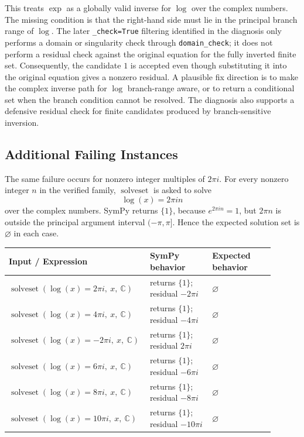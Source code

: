 \documentclass[11pt]{article}
\begin{document}
This treats \(\exp\) as a globally valid inverse for \(\log\) over the complex
numbers.  The missing condition is that the right-hand side must lie in the
principal branch range of \(\log\).  The later \texttt{\_check=True} filtering
identified in the diagnosis only performs a domain or singularity check through
\texttt{domain\_check}; it does not perform a residual check against the
original equation for the fully inverted finite set.  Consequently, the
candidate \(1\) is accepted even though substituting it into the original
equation gives a nonzero residual.  A plausible fix direction is to make the
complex inverse path for \(\log\) branch-range aware, or to return a conditional
set when the branch condition cannot be resolved.  The diagnosis also supports
a defensive residual check for finite candidates produced by branch-sensitive
inversion.

\subsection{Additional Failing Instances}

The same failure occurs for nonzero integer multiples of \(2\pi i\).  For
every nonzero integer \(n\) in the verified family, \(\operatorname{solveset}\)
is asked to solve
\[
  \log(x)=2\pi i n
\]
over the complex numbers.  SymPy returns \(\{1\}\), because
\(e^{2\pi i n}=1\), but \(2\pi n\) is outside the principal argument interval
\((-\pi,\pi]\).  Hence the expected solution set is \(\varnothing\) in each
case.

\begin{center}
\small
\renewcommand{\arraystretch}{1.3}
\begin{tabular}{@{}>{\raggedright\arraybackslash}p{0.44\linewidth}>{\raggedright\arraybackslash}p{0.23\linewidth}>{\raggedright\arraybackslash}p{0.23\linewidth}@{}}
\toprule
\textbf{Input / Expression} & \textbf{SymPy behavior} & \textbf{Expected behavior} \\
\midrule
\(\operatorname{solveset}(\log(x)=2\pi i,\ x,\ \mathbb{C})\) & returns \(\{1\}\); residual \(-2\pi i\) & \(\varnothing\) \\
\(\operatorname{solveset}(\log(x)=4\pi i,\ x,\ \mathbb{C})\) & returns \(\{1\}\); residual \(-4\pi i\) & \(\varnothing\) \\
\(\operatorname{solveset}(\log(x)=-2\pi i,\ x,\ \mathbb{C})\) & returns \(\{1\}\); residual \(2\pi i\) & \(\varnothing\) \\
\(\operatorname{solveset}(\log(x)=6\pi i,\ x,\ \mathbb{C})\) & returns \(\{1\}\); residual \(-6\pi i\) & \(\varnothing\) \\
\(\operatorname{solveset}(\log(x)=8\pi i,\ x,\ \mathbb{C})\) & returns \(\{1\}\); residual \(-8\pi i\) & \(\varnothing\) \\
\(\operatorname{solveset}(\log(x)=10\pi i,\ x,\ \mathbb{C})\) & returns \(\{1\}\); residual \(-10\pi i\) & \(\varnothing\) \\
\bottomrule
\end{tabular}
\end{center}
\end{document}
